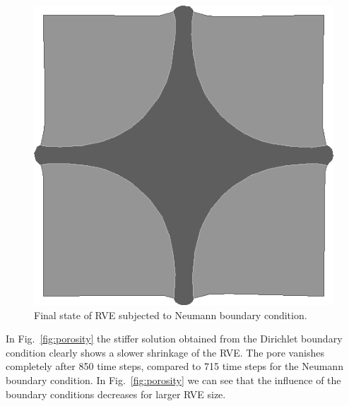 \documentclass[notitlepage,a4paper,fleqn,9pt]{extarticle}
\newcommand{\figref}[1]{Fig.~\ref{#1}}
\begin{document}
\begin{multicols}{2}
\begin{figure}[H]
 \centering
 \includegraphics[scale=0.25]{figures/final_neumann}
 \caption{Final state of RVE subjected to Neumann boundary condition.}
 \label{fig:final_neumann}
\end{figure}

In \figref{fig:porosity} the stiffer solution obtained from the Dirichlet boundary condition clearly shows a slower shrinkage of the RVE.
The pore vanishes completely after 850 time steps, compared to 715 time steps for the Neumann boundary condition.
In \figref{fig:porosity} we can see that the influence of the boundary conditions decreases for larger RVE size.

\begin{figure}[H]
 \centering
{}
\end{figure}
\end{multicols}
\end{document}
